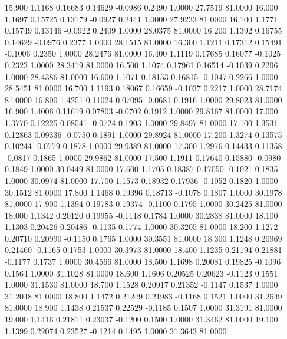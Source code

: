   15.900   1.1168   0.16683   0.14629  -0.0986   0.2490   1.0000  27.7519  81.0000
  16.000   1.1697   0.15725   0.13179  -0.0927   0.2441   1.0000  27.9233  81.0000
  16.100   1.1771   0.15749   0.13146  -0.0922   0.2409   1.0000  28.0375  81.0000
  16.200   1.1392   0.16755   0.14629  -0.0976   0.2377   1.0000  28.1515  81.0000
  16.300   1.1211   0.17312   0.15491  -0.1006   0.2350   1.0000  28.2476  81.0000
  16.400   1.1119   0.17685   0.16077  -0.1025   0.2323   1.0000  28.3419  81.0000
  16.500   1.1074   0.17961   0.16514  -0.1039   0.2296   1.0000  28.4386  81.0000
  16.600   1.1071   0.18153   0.16815  -0.1047   0.2266   1.0000  28.5451  81.0000
  16.700   1.1193   0.18067   0.16659  -0.1037   0.2217   1.0000  28.7174  81.0000
  16.800   1.4251   0.11024   0.07095  -0.0681   0.1916   1.0000  29.8023  81.0000
  16.900   1.4006   0.11619   0.07803  -0.0702   0.1912   1.0000  29.8167  81.0000
  17.000   1.3770   0.12225   0.08541  -0.0724   0.1903   1.0000  29.8497  81.0000
  17.100   1.3531   0.12863   0.09336  -0.0750   0.1891   1.0000  29.8924  81.0000
  17.200   1.3274   0.13575   0.10244  -0.0779   0.1878   1.0000  29.9389  81.0000
  17.300   1.2976   0.14433   0.11358  -0.0817   0.1865   1.0000  29.9862  81.0000
  17.500   1.1911   0.17640   0.15880  -0.0980   0.1849   1.0000  30.0449  81.0000
  17.600   1.1705   0.18387   0.17050  -0.1021   0.1835   1.0000  30.0974  81.0000
  17.700   1.1573   0.18932   0.17936  -0.1052   0.1820   1.0000  30.1512  81.0000
  17.800   1.1468   0.19396   0.18713  -0.1078   0.1807   1.0000  30.1978  81.0000
  17.900   1.1394   0.19783   0.19374  -0.1100   0.1795   1.0000  30.2425  81.0000
  18.000   1.1342   0.20120   0.19955  -0.1118   0.1784   1.0000  30.2838  81.0000
  18.100   1.1303   0.20426   0.20486  -0.1135   0.1774   1.0000  30.3205  81.0000
  18.200   1.1272   0.20710   0.20990  -0.1150   0.1765   1.0000  30.3551  81.0000
  18.300   1.1248   0.20969   0.21460  -0.1165   0.1753   1.0000  30.3973  81.0000
  18.400   1.1235   0.21194   0.21881  -0.1177   0.1737   1.0000  30.4566  81.0000
  18.500   1.1698   0.20081   0.19825  -0.1096   0.1564   1.0000  31.1028  81.0000
  18.600   1.1606   0.20525   0.20623  -0.1123   0.1551   1.0000  31.1530  81.0000
  18.700   1.1528   0.20917   0.21352  -0.1147   0.1537   1.0000  31.2048  81.0000
  18.800   1.1472   0.21249   0.21983  -0.1168   0.1521   1.0000  31.2649  81.0000
  18.900   1.1438   0.21537   0.22529  -0.1185   0.1507   1.0000  31.3191  81.0000
  19.000   1.1416   0.21811   0.23037  -0.1200   0.1500   1.0000  31.3462  81.0000
  19.100   1.1399   0.22074   0.23527  -0.1214   0.1495   1.0000  31.3643  81.0000
